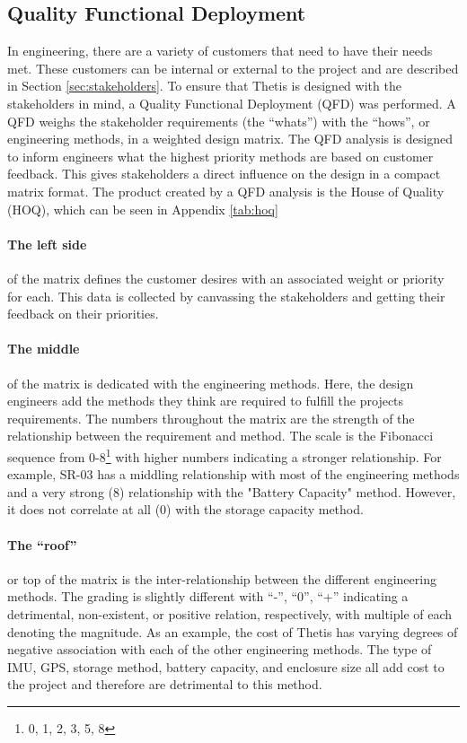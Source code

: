 \begin{landscape}
\end{landscape}

\subsection{Quality Functional Deployment} \label{ssec:qfd}
In engineering, there are a variety of customers that need to have their needs met.
These customers can be internal or external to the project and are described in Section \ref{sec:stakeholders}.
To ensure that Thetis is designed with the stakeholders in mind, a Quality Functional Deployment (QFD) was performed.
A QFD weighs the stakeholder requirements (the ``whats'') with the ``hows'', or engineering methods, in a weighted design matrix.
The QFD analysis is designed to inform engineers what the highest priority methods are based on customer feedback.
This gives stakeholders a direct influence on the design in a compact matrix format.
The product created by a QFD analysis is the House of Quality (HOQ), which can be seen in Appendix \ref{tab:hoq}

\paragraph*{The left side} of the matrix defines the customer desires with an associated weight or priority for each.
This data is collected by canvassing the stakeholders and getting their feedback on their priorities.

\paragraph*{The middle} of the matrix is dedicated with the engineering methods.
Here, the design engineers add the methods they think are required to fulfill the projects requirements.
The numbers throughout the matrix are the strength of the relationship between the requirement and method. 
The scale is the Fibonacci sequence from 0-8\footnote[1]{0, 1, 2, 3, 5, 8} with higher numbers indicating a stronger relationship.
For example, SR-03 has a middling relationship with most of the engineering methods and a very strong (8) relationship with the "Battery Capacity" method.
However, it does not correlate at all (0) with the storage capacity method.

\paragraph*{The ``roof''} or top of the matrix is the inter-relationship between the different engineering methods.
The grading is slightly different with ``-'', ``0'', ``+'' indicating a detrimental, non-existent, or positive relation, respectively, with multiple of each denoting the magnitude.
As an example, the cost of Thetis has varying degrees of negative association with each of the other engineering methods.
The type of IMU, GPS, storage method, battery capacity, and enclosure size all add cost to the project and therefore are detrimental to this method.

